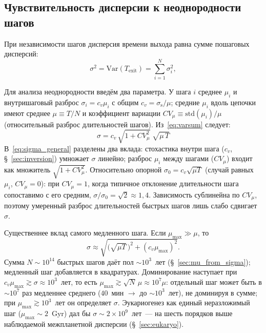 \documentclass[12pt,a4paper]{article}
\begin{document}
\subsection{Чувствительность дисперсии к неоднородности шагов}
\label{sec:heterogeneity}

При независимости шагов дисперсия времени выхода равна сумме пошаговых дисперсий:
\begin{equation}
\sigma^2 = \mathrm{Var}(T_{\mathrm{exit}}) = \sum_{i=1}^{N}\sigma_i^2,
\label{eq:varsum}
\end{equation}

Для анализа неоднородности введём два параметра. У шага $i$ среднее $\mu_i$ и внутришаговый разброс $\sigma_i = c_v\mu_i$ с общим $c_v = \sigma_{\mathrm{s}}/\mu$; средние $\mu_i$ вдоль цепочки имеют среднее $\mu \equiv T/N$ и коэффициент вариации $CV_\mu \equiv \mathrm{std}(\mu_i)/\mu$ (относительный разброс длительностей шагов). Из~\eqref{eq:varsum} следует:
\begin{equation}
\boxed{\;\sigma = c_v\,\sqrt{1+CV_\mu^{2}}\;\sqrt{\mu\,T}\;}
\label{eq:sigma_general}
\end{equation}
В~\eqref{eq:sigma_general} разделены два вклада: стохастика внутри шага ($c_v$, \S~\ref{sec:inversion}) умножает $\sigma$ линейно; разброс $\mu_i$ между шагами ($CV_\mu$) входит как множитель $\sqrt{1+CV_\mu^2}$. Относительно опорной $\sigma_0=c_v\sqrt{\mu T}$ (случай равных $\mu_i$, $CV_\mu=0$): при $CV_\mu=1$, когда типичное отклонение длительности шага сопоставимо с его средним, $\sigma/\sigma_0=\sqrt{2}\approx1{,}4$. Зависимость сублинейна по $CV_\mu$, поэтому умеренный разброс длительностей быстрых шагов лишь слабо сдвигает $\sigma$.

Существеннее вклад самого медленного шага. Если $\mu_{\max}\gg\mu$, то
\begin{equation}
\sigma \approx \sqrt{\big(\sqrt{\mu T}\,\big)^2 + (c_v\mu_{\max})^2}.
\end{equation}
Сумма $N\sim10^{14}$ быстрых шагов даёт пол $\sim10^3$~лет (\S~\ref{sec:mu_from_sigma}); медленный шаг добавляется в квадратурах. Доминирование наступает при $c_v\mu_{\max}\gtrsim\sigma\approx10^3$~лет, то есть $\mu_{\max}\gtrsim\sqrt{N}\,\mu\approx10^{7}\mu$: отдельный шаг может быть в $\sim10^{7}$ раз медленнее среднего ($40$~мин $\to$ до $\sim10^3$~лет), не доминируя в сумме; при $\mu_{\max}\gtrsim10^3$~лет он определяет $\sigma$. Эукариогенез как единый неразложимый шаг ($\mu_{\max}\sim2$~Gyr) дал бы $\sigma\sim2\times10^9$~лет~--- на шесть порядков выше наблюдаемой межпланетной дисперсии (\S~\ref{sec:eukaryo}).
\end{document}
